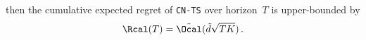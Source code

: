 \documentclass{article}
\theoremstyle{plain}
\begin{document}
\begin{theorem}
then the cumulative expected regret of \texttt{CN-TS} over horizon~$T$ is upper-bounded by
    \begin{equation*}
        \Rcal (T) = \tilde{\Ocal}( \tilde{d} \sqrt{T K}) \, .
    \end{equation*}
\end{theorem}
\end{document}
